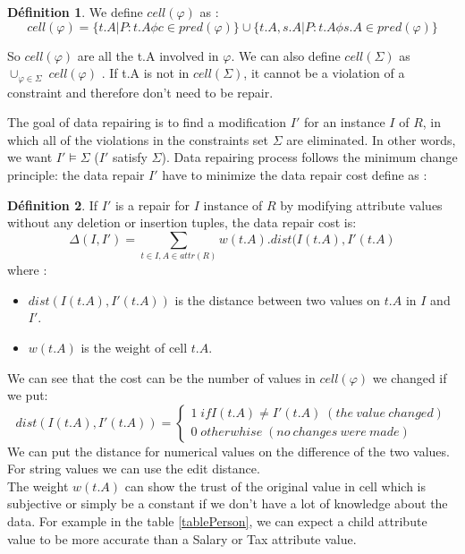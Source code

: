 \documentclass[letterpaper, 12pt]{report}
\theoremstyle{definition}
\newtheorem{mydef}{Définition}
\begin{document}
\begin{mydef}
We define $cell(\varphi)$ as :
$$ cell(\varphi) = \{t.A|P : t.A \phi c \in pred(\varphi) \} \cup \{t.A,s.A|P : t.A \phi s.A \in pred(\varphi) \}$$
\end{mydef}

So $cell(\varphi)$ are all the t.A involved in $\varphi$. We can also define $cell(\Sigma)$ as $\cup_{\varphi \in \Sigma} \; cell(\varphi)$ . If t.A is not in $cell(\Sigma)$, it cannot be a violation of a constraint and therefore don't need to be repair. 

The goal of data repairing is to find a modification $I'$ for an instance $I$ of $R$, in which all of the violations in the constraints set $\Sigma$ are eliminated. In other words, we want $I' \models \Sigma$ ($I'$ satisfy $\Sigma$). Data repairing process follows the minimum change principle: the data repair $I'$ have to minimize the data repair cost define as \cite{main}:
\begin{mydef}
If $I'$ is a repair for $I$ instance of $R$ by modifying attribute values without any deletion or insertion tuples, the data repair cost is:
$$ \Delta(I,I') = \sum_{t \in I, A \in attr(R)} w(t.A).dist(I(t.A),I'(t.A) $$
where :
\begin{itemize}
	\item $dist(I(t.A),I'(t.A))$ is the distance between two values on $t.A$ in $I$ and $I'$.
	\item $w(t.A)$ is the weight of cell $t.A$.
\end{itemize}
\end{mydef}

We can see that the cost can be the number of values in $cell(\varphi)$ we changed if we put:
$$
dist(I(t.A),I'(t.A)) =
\left\{
	\begin{array}{ll}
	  1 \; if I(t.A) \neq I'(t.A)\;(the\ value\ changed) \\
	  0 \; otherwhise\;(no\ changes\ were\ made)
	\end{array}
\right.
$$
We can put the distance for numerical values on the difference of the two values. For string values we can use the edit distance.\\

The weight $w(t.A)$ can show the trust of the original value in cell which is subjective or simply be a constant if we don't have a lot of knowledge about the data. For example in the table \ref{tablePerson}, we can expect a child attribute value to be more accurate than a Salary or Tax attribute value.\\
\end{document}
